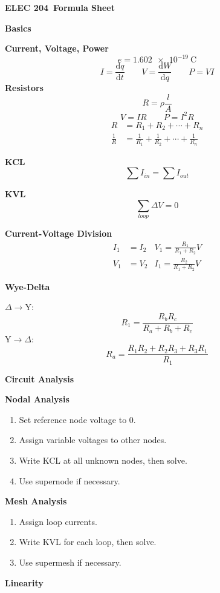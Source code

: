 \documentclass[10pt]{article}
\newcommand{\dv}[2]{\frac{\mathrm{d} #1}{\mathrm{d} #2}}
\newcommand\sectionheading[1]{\begin{center}\large{\textbf{#1}}\end{center}\normalsize}
\newcommand\heading[1]{\textbf{#1}}
\newcommand*{\course}{ELEC 204}
\begin{document}
\begin{center}
    \huge{\textbf{\course \ Formula Sheet}}
\end{center}

\begin{multicols*}{3}

\sectionheading{Basics}
\heading{Current, Voltage, Power}
\[e=\SI{1.602e-19}{\coulomb}\]
\[I=\dv qt\qquad V=\dv Wq\qquad P=VI\]
\heading{Resistors}
\[R=\rho\frac lA\]
\[V=IR\qquad P=I^2R\]
\begin{align*}
    R&=R_1+R_2+\cdots+R_n\tag{series} \\
    \frac 1R&=\frac 1{R_1}+\frac 1{R_2}+\cdots+\frac 1{R_n}\tag{parallel}
\end{align*}

\heading{KCL}
\[\sum I_{in}=\sum I_{out}\]

\heading{KVL}
\[\sum_{loop}\Delta V=0\]

\heading{Current-Voltage Division}
\begin{align*}
    I_1&=I_2 &V_1=\frac{R_1}{R_1+R_2}V \tag{series} \\
    V_1&=V_2 &I_1=\frac{R_2}{R_1+R_2}V \tag{parallel} 
\end{align*}

\heading{Wye-Delta}

$\Delta\to\mathrm Y$:
\[R_1=\frac{R_bR_c}{R_a+R_b+R_c}\]
$\mathrm Y\to\Delta$:
\[R_a=\frac{R_1R_2+R_2R_3+R_3R_1}{R_1}\]

\sectionheading{Circuit Analysis}

\heading{Nodal Analysis}
\begin{enumerate}[topsep=0pt,noitemsep]
    \item Set reference node voltage to $0$.
    \item Assign variable voltages to other nodes.
    \item Write KCL at all unknown nodes, then solve. 
    \item Use supernode if necessary.
\end{enumerate}

\heading{Mesh Analysis}
\begin{enumerate}[topsep=0pt,noitemsep]
    \item Assign loop currents.
    \item Write KVL for each loop, then solve. 
    \item Use supermesh if necessary.
\end{enumerate}

\heading{Linearity}


\end{multicols*}
\end{document}
